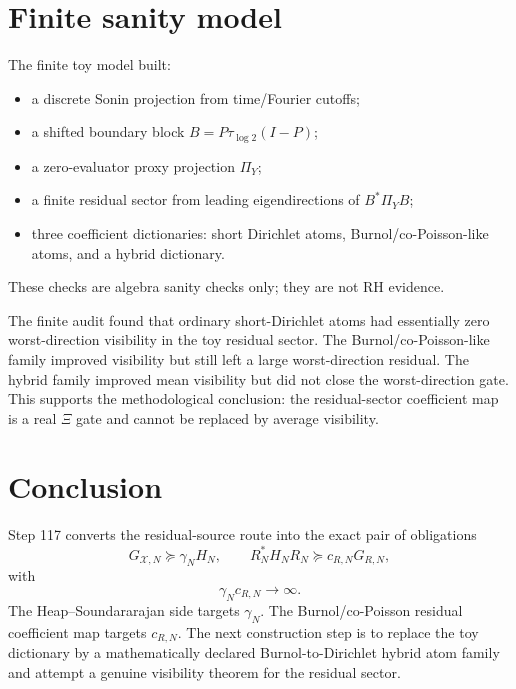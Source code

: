 \documentclass[11pt]{article}
\begin{document}
\section{Finite sanity model}
The finite toy model built:
\begin{itemize}[leftmargin=2em]
\item a discrete Sonin projection from time/Fourier cutoffs;
\item a shifted boundary block $B=P\tau_{\log 2}(I-P)$;
\item a zero-evaluator proxy projection $\Pi_Y$;
\item a finite residual sector from leading eigendirections of $B^*\Pi_YB$;
\item three coefficient dictionaries: short Dirichlet atoms, Burnol/co-Poisson-like atoms, and a hybrid dictionary.
\end{itemize}
These checks are algebra sanity checks only; they are not RH evidence.

The finite audit found that ordinary short-Dirichlet atoms had essentially zero worst-direction visibility in the toy residual sector. The Burnol/co-Poisson-like family improved visibility but still left a large worst-direction residual. The hybrid family improved mean visibility but did not close the worst-direction gate. This supports the methodological conclusion: the residual-sector coefficient map is a real $\Xi$ gate and cannot be replaced by average visibility.

\section{Conclusion}
Step 117 converts the residual-source route into the exact pair of obligations
\[
  G_{\mathcal X,N}\succeq\gamma_NH_N,
  \qquad
  R_N^*H_NR_N\succeq c_{R,N}G_{R,N},
\]
with
\[
  \gamma_Nc_{R,N}\to\infty.
\]
The Heap--Soundararajan side targets $\gamma_N$. The Burnol/co-Poisson residual coefficient map targets $c_{R,N}$. The next construction step is to replace the toy dictionary by a mathematically declared Burnol-to-Dirichlet hybrid atom family and attempt a genuine visibility theorem for the residual sector.
\end{document}
